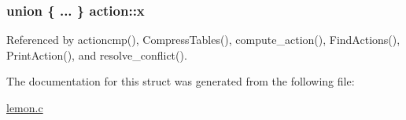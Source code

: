 \hypertarget{structaction_ac107dc4c91dd2415581d1f1264ccc92b}{
\subsubsection[{x}]{\setlength{\rightskip}{0pt plus 5cm}union \{ ... \}   action\-::x}}\label{structaction_ac107dc4c91dd2415581d1f1264ccc92b}


Referenced by actioncmp(), Compress\-Tables(), compute\-\_\-action(), Find\-Actions(), Print\-Action(), and resolve\-\_\-conflict().



The documentation for this struct was generated from the following file\-:\begin{DoxyCompactItemize}
\item 
\hyperlink{lemon_8c}{lemon.\-c}\end{DoxyCompactItemize}
